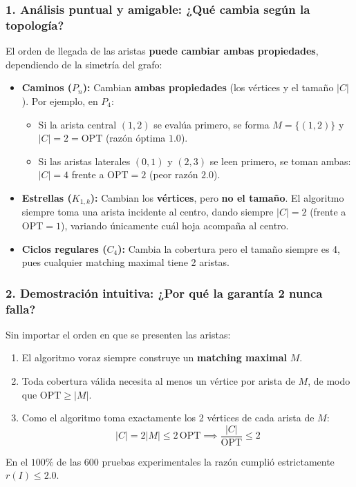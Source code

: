 \subsubsection*{1. Análisis puntual y amigable: ¿Qué cambia según la topología?}
El orden de llegada de las aristas \textbf{puede cambiar ambas propiedades}, dependiendo de la simetría del grafo:
\begin{itemize}
    \item \textbf{Caminos ($P_n$):} Cambian \textbf{ambas propiedades} (los vértices y el tamaño $|C|$). Por ejemplo, en $P_4$:
    \begin{itemize}
        \item Si la arista central $(1, 2)$ se evalúa primero, se forma $M = \{(1, 2)\}$ y $|C| = 2 = \text{OPT}$ (razón óptima $1.0$).
        \item Si las aristas laterales $(0, 1)$ y $(2, 3)$ se leen primero, se toman ambas: $|C| = 4$ frente a $\text{OPT} = 2$ (peor razón $2.0$).
    \end{itemize}
    \item \textbf{Estrellas ($K_{1, k}$):} Cambian los \textbf{vértices}, pero \textbf{no el tamaño}. El algoritmo siempre toma una arista incidente al centro, dando siempre $|C| = 2$ (frente a $\text{OPT} = 1$), variando únicamente cuál hoja acompaña al centro.
    \item \textbf{Ciclos regulares ($C_4$):} Cambia la cobertura pero el tamaño siempre es 4, pues cualquier matching maximal tiene 2 aristas.
\end{itemize}

\subsubsection*{2. Demostración intuitiva: ¿Por qué la garantía 2 nunca falla?}
Sin importar el orden en que se presenten las aristas:
\begin{enumerate}
    \item El algoritmo voraz siempre construye un \textbf{matching maximal} $M$.
    \item Toda cobertura válida necesita al menos un vértice por arista de $M$, de modo que $\text{OPT} \ge |M|$.
    \item Como el algoritmo toma exactamente los 2 vértices de cada arista de $M$:
    \begin{equation}
        |C| = 2|M| \le 2\,\text{OPT} \implies \frac{|C|}{\text{OPT}} \le 2
    \end{equation}
\end{enumerate}
En el $100\%$ de las 600 pruebas experimentales la razón cumplió estrictamente $r(I) \le 2.0$.

